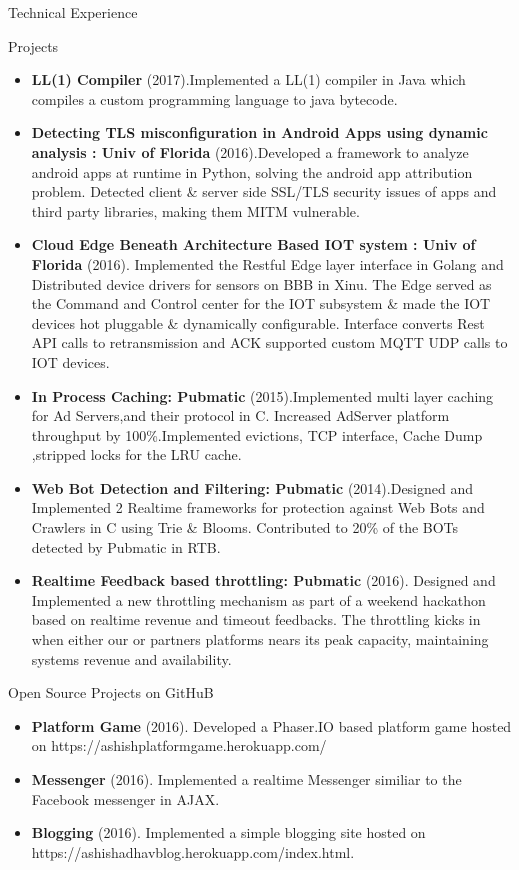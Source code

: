 \documentclass[]{mcdowellcv}
\begin{document}
	\begin{cvsection}{Technical Experience}
		\begin{cvsubsection}{Projects}{}{}
			\begin{itemize}
				\item \textbf{LL(1) Compiler} (2017).Implemented a LL(1) compiler in Java which compiles a custom programming language to java bytecode.
				\item \textbf{Detecting TLS misconfiguration in Android Apps using dynamic analysis : Univ of Florida} (2016).Developed a framework to analyze android apps at runtime in Python, solving the android app attribution problem. Detected client \& server side SSL/TLS security issues of apps and third party libraries, making them MITM vulnerable.
				\item \textbf{Cloud Edge Beneath Architecture Based IOT system : Univ of Florida} (2016).  Implemented the Restful Edge layer interface in Golang and Distributed device drivers for sensors on BBB in Xinu. The Edge served as the Command and Control center for the IOT subsystem \& made the IOT devices hot pluggable \& dynamically configurable. Interface converts Rest API calls to retransmission and ACK supported custom MQTT UDP calls to IOT devices.
				\item \textbf{In Process Caching: Pubmatic} (2015).Implemented multi layer caching for Ad Servers,and their protocol in C. Increased AdServer platform throughput by 100\%.Implemented evictions, TCP interface, Cache Dump ,stripped locks for the LRU cache.
				
				\item \textbf{Web Bot Detection and Filtering: Pubmatic} (2014).Designed and Implemented 2 Realtime frameworks for protection against Web Bots and Crawlers in C using Trie \& Blooms. Contributed to 20\% of the BOTs detected by Pubmatic in RTB.

				\item \textbf{Realtime Feedback based throttling: Pubmatic} (2016).  Designed and Implemented a new throttling mechanism as part of a weekend hackathon based on realtime revenue and timeout feedbacks. The throttling kicks in when either our or partners platforms nears its peak capacity, maintaining systems revenue and availability.

			\end{itemize}
		\end{cvsubsection}
		\begin{cvsubsection}{Open Source Projects on GitHuB}{}{}
			\begin{itemize}
				\item \textbf{ Platform Game} (2016). Developed a Phaser.IO based platform game hosted on https://ashishplatformgame.herokuapp.com/
				\item \textbf{ Messenger} (2016). Implemented a realtime Messenger similiar to the Facebook messenger in AJAX.
				\item \textbf{ Blogging} (2016). Implemented a simple blogging site hosted on https://ashishadhavblog.herokuapp.com/index.html.
			\end{itemize}
		\end{cvsubsection}


\end{cvsection}
\end{document}
